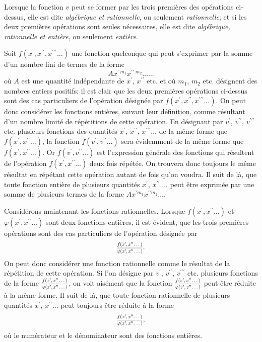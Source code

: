 \documentclass[oneside, 12 pt, leqno]{memoir}
\let\oldfrac\frac
\def\frac#1#2{\mathchoice{\text{\scalebox{.83}{${\oldfrac{#1}{#2}}$}}}{\text{\scalebox{.83}{${\displaystyle\oldfrac{#1}{#2}}$}}}{\genfrac{}{}{}{2}{#1}{#2}}{\genfrac{}{}{}{3}{#1}{#2}}}
\begin{document}
Lorsque la fonction \(v\) peut se former par les trois premières des opérations ci-dessus, elle est dite \textit{algébrique et rationnelle}, ou seulement \textit{rationnelle}; et si les deux premières opérations sont seules nécessaires, elle est dite \textit{algébrique, rationnelle et entière}, ou seulement \textit{entière}.

Soit \(f(x^{\prime}, x^{\prime \prime}, x^{\prime \prime \prime} \dots)\) une fonction quelconque qui peut s'exprimer par la somme d'un nombre fini de termes de la forme
\[A x^{\prime\; m_1} x^{\prime\prime\; m_2} \dots \dots\]
où \(A\) est une quantité indépendante de \(x^{\prime}\), \(x^{\prime \prime}\) etc. et où \(m_1\), \(m_2\) etc. désignent des nombres entiers positifs; il est clair que les deux premières opérations ci-dessus sont des cas particuliers de l'opération désignée par \(f(x^{\prime}, x^{\prime \prime}, x^{\prime \prime \prime} \dots)\). On peut donc considérer les fonctions entières, suivant leur définition, comme résultant d'un nombre limité de répétitions de cette opération. En désignant par \(v^{\prime}\), \(v^{\prime \prime}\), \(v^{\prime \prime \prime}\) etc. plusieurs fonctions des quantités \(x^{\prime}\), \(x^{\prime \prime}\), \(x^{\prime \prime \prime} \dots\) de la même forme que \(f(x^{\prime}, x^{\prime \prime} \dots)\), la fonction \(f(v^{\prime}, v^{\prime \prime} \dots)\) sera évidemment de la même forme que \(f(x^{\prime}, x^{\prime \prime} \dots)\). Or \(f(v^{\prime}, v^{\prime \prime} \dots)\) est l'expression générale des fonctions qui résultent de l'opération \(f(x^{\prime}, x^{\prime \prime} \dots)\) deux fois répétée. On trouvera donc toujours le même résultat en répétant cette opération autant de fois qu'on voudra. Il suit de là, que toute fonction entière de plusieurs quantités \(x^{\prime}\), \(x^{\prime \prime} \dots\). peut être exprimée par une somme de plusieurs termes de la forme \(A x^{\prime m_1} x^{\prime \prime m_2} \dots\).

Considérons maintenant les fonctions rationnelles. Lorsque \(f(x^{\prime}, x^{\prime \prime} \dots)\) et \(\varphi(x^{\prime}, x^{\prime \prime} \dots)\) sont deux fonctions entières, il est évident, que les trois premières opérations sont des cas particuliers de l'opération désignée par
\[\frac{f(x^{\prime}, x^{\prime \prime} \dots)}{\varphi(x^{\prime}, x^{\prime \prime} \dots)}.\]
On peut donc considérer une fonction rationnelle comme le résultat de la répétition de cette opération. Si l'on désigne par \(v^{\prime}\), \(v^{\prime \prime}\), \(v^{\prime \prime \prime}\) etc. plusieurs fonctions de la forme \(\frac{f(x^{\prime}, x^{\prime \prime} \dots)}{\varphi(x^{\prime}, x^{\prime \prime} \dots)}\), on voit aisément que la fonction \(\frac{f(v^{\prime}, v^{\prime \prime} \dots)}{\varphi(v^{\prime}, v^{\prime \prime} \dots)}\) peut être réduite à la même forme. Il suit de là, que toute fonction rationnelle de plusieurs quantités \(x^{\prime}\), \(x^{\prime \prime} \dots\) peut toujours être réduite à la forme
\[\frac{f(x^{\prime}, x^{\prime \prime} \dots)}{{\varphi}(x^{\prime}, x^{\prime \prime} \dots)},\]
où le numérateur et le dénominateur sont des fonctions entières.
\end{document}
